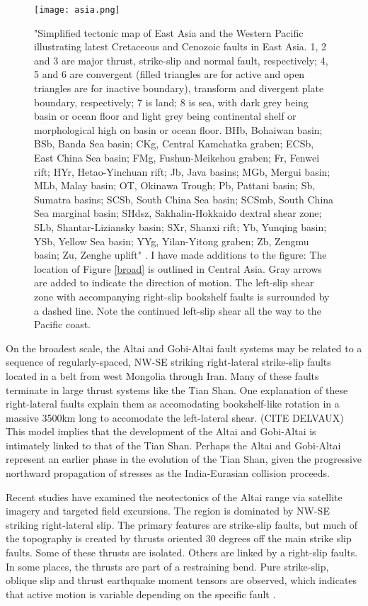 \documentclass[10pt,a4paper]{article}
\begin{document}
\begin{figure}[h!]
	\centering
	\texttt{[image: asia.png]}
	\caption{"Simplified tectonic map of East Asia and the Western Pacific illustrating latest Cretaceous and Cenozoic faults in East Asia. 1, 2 and 3 are major thrust, strike-slip and normal fault, respectively; 4, 5 and 6 are convergent (filled triangles are for active and open triangles are for inactive boundary), transform and divergent plate boundary, respectively; 7 is land; 8 is sea, with dark grey being basin or ocean floor and light grey being continental shelf or morphological high on basin or ocean floor. BHb, Bohaiwan basin; BSb, Banda Sea basin; CKg, Central Kamchatka graben; ECSb, East China Sea basin; FMg, Fushun-Meikehou graben; Fr, Fenwei rift; HYr, Hetao-Yinchuan rift; Jb, Java basins; MGb, Mergui basin; MLb, Malay basin; OT, Okinawa Trough; Pb, Pattani basin; Sb, Sumatra basins; SCSb, South China Sea basin; SCSmb, South China Sea marginal basin; SHdsz, Sakhalin-Hokkaido dextral shear zone; SLb, Shantar-Liziansky basin; SXr, Shanxi rift; Yb, Yunqing basin; YSb, Yellow Sea basin; YYg, Yilan-Yitong graben; Zb, Zengmu basin; Zu, Zenghe uplift" \citep{Schellart2005}. I have made additions to the figure: The location of Figure \ref{broad} is outlined in Central Asia. Gray arrows are added to indicate the direction of motion. The left-slip shear zone with accompanying right-slip bookshelf faults is surrounded by a dashed line. Note the continued left-slip shear all the way to the Pacific coast.}
\end{figure}

	On the broadest scale, the Altai and Gobi-Altai fault systems may be related to a sequence of regularly-spaced, NW-SE striking right-lateral strike-slip faults \citep{Yin2010} located in a belt from west Mongolia through Iran. Many of these faults terminate in large thrust systems like the Tian Shan. One explanation of these right-lateral faults explain them as accomodating bookshelf-like rotation in a massive 3500km long  to accomodate the left-lateral shear. (CITE DELVAUX) \citep{Bayasgalan2005a} This model implies that the development of the Altai and Gobi-Altai is intimately linked to that of the Tian Shan. Perhaps the Altai and Gobi-Altai represent an earlier phase in the evolution of the Tian Shan, given the progressive northward propagation of stresses as the India-Eurasian collision proceeds.

	Recent studies have examined the neotectonics of the Altai range via satellite imagery and targeted field excursions\citep{Cunningham2005a}. The region is dominated by NW-SE striking right-lateral slip. The primary features are strike-slip faults, but much of the topography is created by thrusts oriented 30 degrees off the main strike slip faults. Some of these thrusts are isolated. Others are linked by a right-slip faults. In some places, the thrusts are part of a restraining bend. Pure strike-slip, oblique slip and thrust earthquake moment tensors are observed, which indicates that active motion is variable depending on the specific fault \citep{Bayasgalan2005a}.  
\end{document}
